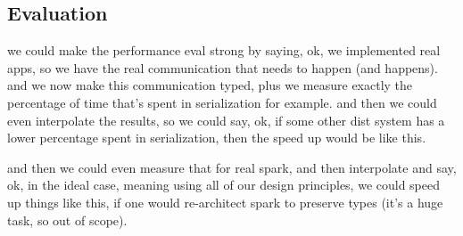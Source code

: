 \documentclass[preprint]{sigplanconf}
\theoremstyle{definition}
\theoremstyle{definition}
\begin{document}









\subsection{Evaluation}

we could make the performance eval strong by saying, ok, we implemented real
apps, so we have the real communication that needs to happen (and happens).
and we now make this communication typed, plus we measure exactly the
percentage of time that's spent in serialization for example. and then we
could even interpolate the results, so we could say, ok, if some other dist
system has a lower percentage spent in serialization, then the speed up would
be like this.

and then we could even measure that for real spark, and then interpolate and
say, ok, in the ideal case, meaning using all of our design principles, we
could speed up things like this, if one would re-architect spark to preserve
types (it's a huge task, so out of scope).
\end{document}
